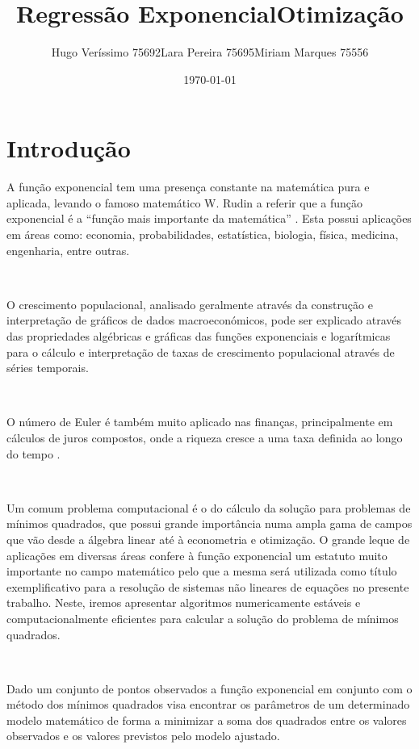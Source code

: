 \documentclass[]{article}
\title{Regressão Exponencial\newline\large Otimização}
\author{Hugo Veríssimo 75692\newline Lara Pereira 75695\newline Miriam
Marques 75556}
\date{\today}
\numberwithin{equation}{subsection}
\begin{document}
\maketitle
\tableofcontents
{}
\clearpage

\section{Introdução}

A função exponencial tem uma presença constante na matemática pura e
aplicada, levando o famoso matemático W. Rudin a referir que a função
exponencial é a ``função mais importante da matemática'' \cite{WR87}.
Esta possui aplicações em áreas como: economia, probabilidades,
estatística, biologia, física, medicina, engenharia, entre outras.

\(\ \)

O crescimento populacional, analisado geralmente através da construção e
interpretação de gráficos de dados macroeconómicos, pode ser explicado
através das propriedades algébricas e gráficas das funções exponenciais
e logarítmicas para o cálculo e interpretação de taxas de crescimento
populacional através de séries temporais.

\(\ \)

O número de Euler é também muito aplicado nas finanças, principalmente
em cálculos de juros compostos, onde a riqueza cresce a uma taxa
definida ao longo do tempo \cite{WK23}.

\(\ \)

Um comum problema computacional é o do cálculo da solução para problemas
de mínimos quadrados, que possui grande importância numa ampla gama de
campos que vão desde a álgebra linear até à econometria e otimização. O
grande leque de aplicações em diversas áreas confere à função
exponencial um estatuto muito importante no campo matemático pelo que a
mesma será utilizada como título exemplificativo para a resolução de
sistemas não lineares de equações no presente trabalho. Neste, iremos
apresentar algoritmos numericamente estáveis e computacionalmente
eficientes para calcular a solução do problema de mínimos quadrados.

\(\ \)

Dado um conjunto de pontos observados a função exponencial em conjunto
com o método dos mínimos quadrados visa encontrar os parâmetros de um
determinado modelo matemático de forma a minimizar a soma dos quadrados
entre os valores observados e os valores previstos pelo modelo ajustado.
\end{document}
